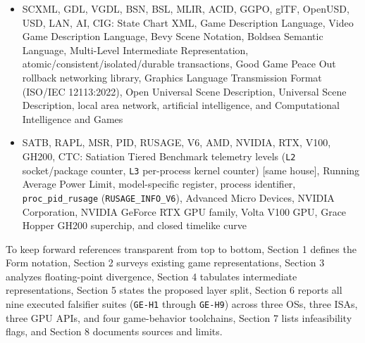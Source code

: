 \documentclass[10pt,letterpaper]{article}
\begin{document}
\begin{itemize}
  CRLF, CS0246, RE, ENGINE, DFU: Mesa Radeon Vulkan driver, Mesa Intel
  Vulkan driver, Low Level Virtual Machine compiler infrastructure,
  GNU's Not Unix project, GNU Compiler Collection, Microsoft Visual C++
  compiler (\texttt{cl.exe}), Windows Universal C Runtime
  (\texttt{ucrtbase.\allowbreak{}dll}), Windows New Technology kernel
  (\texttt{Windows\ NT}), Windows Portable Executable, operating
  system(s), application programming interface(s), just-in-time
  compiler, virtual machine, non-comment non-blank source lines of code,
  heads-up display, user interface, sound effects, line of sight,
  axis-aligned bounding box, hit points, experience points, action
  points, kilobytes, megabytes, create/read/update/delete operations,
  natural language, vision-language model, large language model, Great
  Firewall network filter, X virtual framebuffer display server, Web
  Extended Reality API, Web Model Context Protocol, Uniform Resource
  Locator, JavaScript Object Notation, YAML Ain't Markup Language,
  repository README documentation file, New Technology File System,
  carriage-return line-feed sequence, C\# compiler missing-type
  diagnostic CS0246, Capcom RE ENGINE (``Reach for the Moon'' / ``RE
  neXt'' engine branding), and Dagstuhl Follow-Ups DOI prefix
\item
  SCXML, GDL, VGDL, BSN, BSL, MLIR, ACID, GGPO, glTF, OpenUSD, USD, LAN,
  AI, CIG: State Chart XML, Game Description Language, Video Game
  Description Language, Bevy Scene Notation, Boldsea Semantic Language,
  Multi-Level Intermediate Representation,
  atomic/consistent/isolated/durable transactions, Good Game Peace Out
  rollback networking library, Graphics Language Transmission Format
  (ISO/IEC 12113:2022), Open Universal Scene Description, Universal
  Scene Description, local area network, artificial intelligence, and
  Computational Intelligence and Games
\item
  SATB, RAPL, MSR, PID, RUSAGE, V6, AMD, NVIDIA, RTX, V100, GH200, CTC:
  Satiation Tiered Benchmark telemetry levels (\texttt{L2}
  socket/package counter, \texttt{L3} per-process kernel counter)
  {[}same house{]}, Running Average Power Limit, model-specific
  register, process identifier, \texttt{proc\_\allowbreak{}pid\_\allowbreak{}rusage}
  (\texttt{RUSAGE\_\allowbreak{}INFO\_\allowbreak{}V6}), Advanced Micro Devices, NVIDIA
  Corporation, NVIDIA GeForce RTX GPU family, Volta V100 GPU, Grace
  Hopper GH200 superchip, and closed timelike curve
\end{itemize}

To keep forward references transparent from top to bottom, Section 1
defines the Form notation, Section 2 surveys existing game
representations, Section 3 analyzes floating-point divergence, Section 4
tabulates intermediate representations, Section 5 states the proposed
layer split, Section 6 reports all nine executed falsifier suites
(\texttt{GE-H1} through \texttt{GE-H9}) across three OSs, three ISAs,
three GPU APIs, and four game-behavior toolchains, Section 7 lists
infeasibility flags, and Section 8 documents sources and limits.
\end{document}
